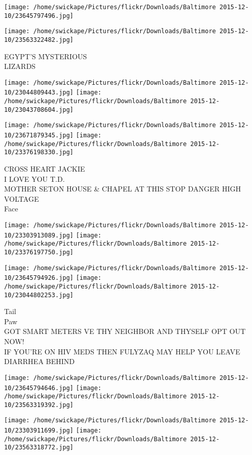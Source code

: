 \documentclass[10pt,letterpaper]{article}
\begin{document}
\texttt{[image: /home/swickape/Pictures/flickr/Downloads/Baltimore 2015-12-10/23645797496.jpg]}

\vspace{0.25in}
\texttt{[image: /home/swickape/Pictures/flickr/Downloads/Baltimore 2015-12-10/23563322482.jpg]}

EGYPT'S MYSTERIOUS\\
LIZARDS\\
\pagebreak

\texttt{[image: /home/swickape/Pictures/flickr/Downloads/Baltimore 2015-12-10/23044809443.jpg]}
\texttt{[image: /home/swickape/Pictures/flickr/Downloads/Baltimore 2015-12-10/23043708604.jpg]}

\texttt{[image: /home/swickape/Pictures/flickr/Downloads/Baltimore 2015-12-10/23671879345.jpg]}
\texttt{[image: /home/swickape/Pictures/flickr/Downloads/Baltimore 2015-12-10/23376198330.jpg]}

CROSS HEART JACKIE\\
I LOVE YOU T.D.\\
MOTHER SETON HOUSE \& CHAPEL AT THIS STOP DANGER HIGH VOLTAGE\\
Face\\
\pagebreak

\texttt{[image: /home/swickape/Pictures/flickr/Downloads/Baltimore 2015-12-10/23303913089.jpg]}
\texttt{[image: /home/swickape/Pictures/flickr/Downloads/Baltimore 2015-12-10/23376197750.jpg]}

\texttt{[image: /home/swickape/Pictures/flickr/Downloads/Baltimore 2015-12-10/23645794926.jpg]}
\texttt{[image: /home/swickape/Pictures/flickr/Downloads/Baltimore 2015-12-10/23044802253.jpg]}

Tail\\
Paw\\
GOT SMART METERS VE THY NEIGHBOR AND THYSELF OPT OUT NOW!\\
IF YOU'RE ON HIV MEDS THEN FULYZAQ MAY HELP YOU LEAVE DIARRHEA BEHIND\\
\pagebreak

\texttt{[image: /home/swickape/Pictures/flickr/Downloads/Baltimore 2015-12-10/23645794646.jpg]}
\texttt{[image: /home/swickape/Pictures/flickr/Downloads/Baltimore 2015-12-10/23563319392.jpg]}

\texttt{[image: /home/swickape/Pictures/flickr/Downloads/Baltimore 2015-12-10/23303911699.jpg]}
\texttt{[image: /home/swickape/Pictures/flickr/Downloads/Baltimore 2015-12-10/23563318772.jpg]}
\end{document}
